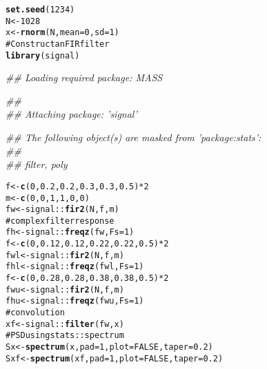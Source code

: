 \documentclass[11pt]{article}\usepackage{graphicx, color}
\makeatletter
\newcommand{\hlfunctioncall}[1]{\textcolor[rgb]{0.501960784313725,0,0.329411764705882}{\textbf{#1}}}%
\newcommand{\hlcomment}[1]{\textcolor[rgb]{0.180392156862745,0.6,0.341176470588235}{#1}}%
\newenvironment{kframe}{%
 \def\at@end@of@kframe{}%
 \ifinner\ifhmode%
  \def\at@end@of@kframe{\end{minipage}}%
  \begin{minipage}{\columnwidth}%
 \fi\fi%
 \def\FrameCommand##1{\hskip\@totalleftmargin \hskip-\fboxsep
 \colorbox{shadecolor}{##1}\hskip-\fboxsep
     \hskip-\linewidth \hskip-\@totalleftmargin \hskip\columnwidth}%
 \MakeFramed {\advance\hsize-\width
   \@totalleftmargin\z@ \linewidth\hsize
   \@setminipage}}%
 {\par\unskip\endMakeFramed%
 \at@end@of@kframe}
\newenvironment{knitrout}{}{} %
\makeatother
\begin{document}
\begin{knitrout}
\color{fgcolor}\begin{kframe}
\begin{alltt}
\hlfunctioncall{set.seed}(1234)
N <- 1028
x <- \hlfunctioncall{rnorm}(N, mean = 0, sd = 1)
\hlcomment{# Construct an FIR filter}
\hlfunctioncall{library}(signal)
\end{alltt}


{\ttfamily\noindent\itshape\textcolor{messagecolor}{\#\# Loading required package: MASS}}

{\ttfamily\noindent\itshape\textcolor{messagecolor}{\#\# \\\#\# Attaching package: 'signal'}}

{\ttfamily\noindent\itshape\textcolor{messagecolor}{\#\# The following object(s) are masked from 'package:stats':\\\#\# \\\#\#     filter, poly}}\begin{alltt}
f <- \hlfunctioncall{c}(0, 0.2, 0.2, 0.3, 0.3, 0.5) * 2
m <- \hlfunctioncall{c}(0, 0, 1, 1, 0, 0)
fw <- signal::\hlfunctioncall{fir2}(N, f, m)
\hlcomment{# complex filter response}
fh <- signal::\hlfunctioncall{freqz}(fw, Fs = 1)
f <- \hlfunctioncall{c}(0, 0.12, 0.12, 0.22, 0.22, 0.5) * 2
fwl <- signal::\hlfunctioncall{fir2}(N, f, m)
fhl <- signal::\hlfunctioncall{freqz}(fwl, Fs = 1)
f <- \hlfunctioncall{c}(0, 0.28, 0.28, 0.38, 0.38, 0.5) * 2
fwu <- signal::\hlfunctioncall{fir2}(N, f, m)
fhu <- signal::\hlfunctioncall{freqz}(fwu, Fs = 1)
\hlcomment{# convolution}
xf <- signal::\hlfunctioncall{filter}(fw, x)
\hlcomment{# PSD using stats::spectrum}
Sx <- \hlfunctioncall{spectrum}(x, pad = 1, plot = FALSE, taper = 0.2)
Sxf <- \hlfunctioncall{spectrum}(xf, pad = 1, plot = FALSE, taper = 0.2)
\end{alltt}
\end{kframe}
\end{knitrout}
\end{document}

